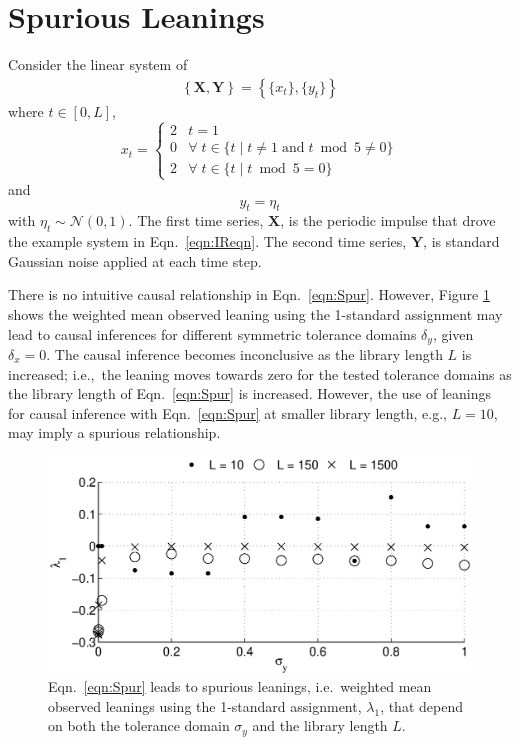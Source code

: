 \documentclass[twocolumn,aps,pre,groupedaddress]{revtex4-1}
\begin{document}
\section{Spurious Leanings}
Consider the linear system of
\begin{eqnarray}
\label{eqn:Spur}
\left\{\mathbf{X},\mathbf{Y}\right\} = \left\{\{x_t\},\{y_t\}\right\}
\end{eqnarray}
where $t\in[0,L]$,
\begin{equation*}
x_t = \left\{
  \begin{array}{lr}
    2 & t = 1\\
    0 & \forall\; t\in\{t\;|\;t\neq 1 \;\mathrm{and}\; t\bmod 5 \neq 0\}\\
    2 & \forall\; t\in\{t\;|\;t\bmod 5 = 0\}
  \end{array}
\right.
\end{equation*}
and
\begin{equation*}
y_t = \eta_t
\end{equation*}
with $\eta_t\sim\mathcal{N}\left(0,1\right)$.  The first time series, $\mathbf{X}$, is the periodic impulse that drove the example system in Eqn.\ \ref{eqn:IReqn}.  The second time series, $\mathbf{Y}$, is standard Gaussian noise applied at each time step.  

There is no intuitive causal relationship in Eqn.\ \ref{eqn:Spur}.  However, Figure \ref{fig:nocause} shows the weighted mean observed leaning using the 1-standard assignment may lead to causal inferences for different symmetric tolerance domains $\delta_y$, given $\delta_x = 0$.  The causal inference becomes inconclusive as the library length $L$ is increased; i.e.,\ the leaning moves towards zero for the tested tolerance domains as the library length of Eqn.\ \ref{eqn:Spur} is increased.  However, the use of leanings for causal inference with Eqn.\ \ref{eqn:Spur} at smaller library length, e.g., $L=10$, may imply a spurious relationship. 
\begin{figure}[ht]
\includegraphics[scale=0.40]{NoCauseplot.eps}
\caption{Eqn.\ \ref{eqn:Spur} leads to spurious leanings, i.e.\ weighted mean observed leanings using the 1-standard assignment, $\lambda_1$, that depend on both the tolerance domain $\sigma_y$ and the library length $L$.}
\label{fig:nocause}
\end{figure}
\end{document}
